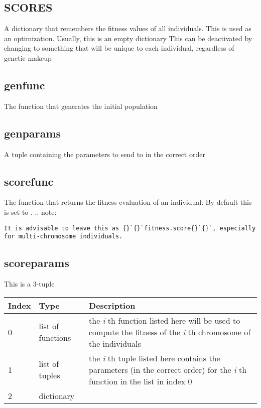 \documentclass[letterpaper,10pt,english]{sphinxmanual}
\begin{document}
\subsection{SCORES}
\label{settings.py:scores}
A dictionary that remembers the fitness values of all individuals. This is used as an optimization. Usually, this is an empty dictionary
This can be deactivated by changing  to something that will be unique to each individual, regardless of genetic makeup


\subsection{genfunc}
\label{settings.py:genfunc}
The function that generates the initial population


\subsection{genparams}
\label{settings.py:genparams}
A tuple containing the parameters to send to  in the correct order


\subsection{scorefunc}
\label{settings.py:scorefunc}
The function that returns the fitness evaluation of an individual. By default this is set to .
.. note:

\begin{Verbatim}[commandchars=\\\{\}]
It is advisable to leave this as {}`{}`fitness.score{}`{}`, especially for multi-chromosome individuals.
\end{Verbatim}


\subsection{scoreparams}
\label{settings.py:scoreparams}
This is a 3-tuple

\begin{tabulary}{\linewidth}{|L|L|L|}
\hline
\textbf{
Index
} & \textbf{
Type
} & \textbf{
Description
}\\\hline

0
 & 
list of functions
 & 
the \emph{i} th function listed here will be used to compute the fitness of the \emph{i} th chromosome of the individuals
\\\hline

1
 & 
list of tuples
 & 
the \emph{i} th tuple listed here contains the parameters (in the correct order) for the \emph{i} th function in the list in index 0
\\\hline

2
 & 
dictionary
 & 
\\\hline
\end{tabulary}
\end{document}
